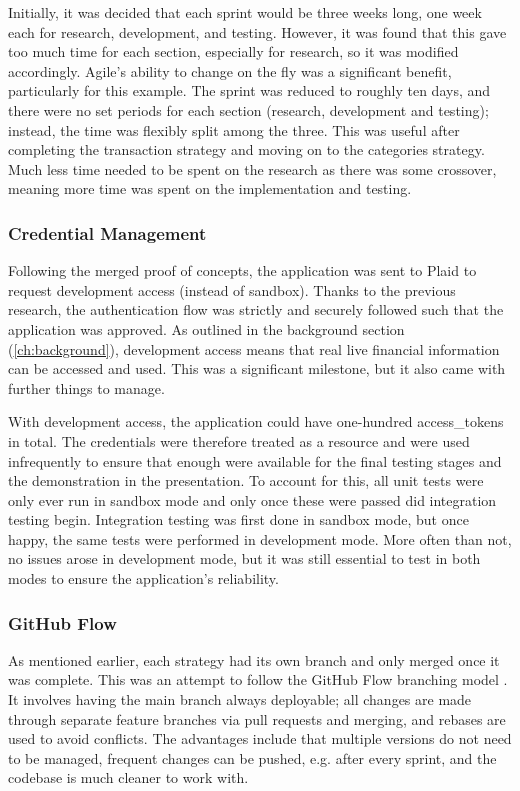Initially, it was decided that each sprint would be three weeks long, one week each for research, development, and testing. However, it was found that this gave too much time for each section, especially for research, so it was modified accordingly. Agile's ability to change on the fly was a significant benefit, particularly for this example. The sprint was reduced to roughly ten days, and there were no set periods for each section (research, development and testing); instead, the time was flexibly split among the three. This was useful after completing the transaction strategy and moving on to the categories strategy. Much less time needed to be spent on the research as there was some crossover, meaning more time was spent on the implementation and testing.

\subsubsection{Credential Management}
Following the merged proof of concepts, the application was sent to Plaid to request development access (instead of sandbox). Thanks to the previous research, the authentication flow was strictly and securely followed such that the application was approved. As outlined in the background section (\ref{ch:background}), development access means that real live financial information can be accessed and used. This was a significant milestone, but it also came with further things to manage. 

With development access, the application could have one-hundred access\_tokens in total. The credentials were therefore treated as a resource and were used infrequently to ensure that enough were available for the final testing stages and the demonstration in the presentation. To account for this, all unit tests were only ever run in sandbox mode and only once these were passed did integration testing begin. Integration testing was first done in sandbox mode, but once happy, the same tests were performed in development mode. More often than not, no issues arose in development mode, but it was still essential to test in both modes to ensure the application's reliability.


\subsubsection{GitHub Flow}
As mentioned earlier, each strategy had its own branch and only merged once it was complete. This was an attempt to follow the GitHub Flow branching model \cite{GitHubFlow}. It involves having the main branch always deployable; all changes are made through separate feature branches via pull requests and merging, and rebases are used to avoid conflicts. The advantages include that multiple versions do not need to be managed, frequent changes can be pushed, e.g. after every sprint, and the codebase is much cleaner to work with.

